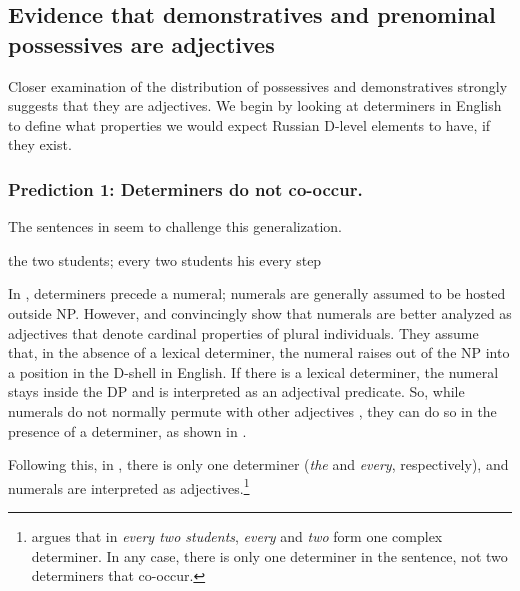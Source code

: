 \documentclass[output=paper,
colorlinks,
citecolor=brown,
newtxmath
]{langscibook}
\begin{document}

\subsection{Evidence that demonstratives and prenominal possessives are adjectives}

Closer examination of the distribution of possessives and demonstratives strong\-ly suggests that they are adjectives. We begin by looking at determiners in English to define what properties we would expect Russian D-level elements to have, if they exist.

\subsubsection*{Prediction 1: Determiners do not co-occur.}


\ea{}
\z\z

\noindent The sentences in  seem to challenge this generalization.


\ea\label{determiners}
    \ea the two students; every two students\label{twostudents}
    \ex his every step\label{hisstep}
\z\z

\noindent In , determiners precede a numeral; numerals are generally assumed to be hosted outside NP. However, \citet{Landman2003,Landman2004} and \citet{Rothstein2013,Rothstein2017} convincingly show that numerals are better analyzed as adjectives that denote cardinal properties of plural individuals. They assume that, in the absence of a lexical determiner, the numeral raises out of the NP into a position in the D-shell in English. If there is a lexical determiner, the numeral stays inside the DP and is interpreted as an adjectival predicate. So, while numerals do not normally permute with other adjectives , they can do so in the presence of a determiner, as shown in . 


\ea
    \label{fiftylions}
     \hfill \citep[217]{Landman2003}
\z\z

\noindent Following this, in , there is only one determiner (\textit{the} and \textit{every}, respectively), and numerals are interpreted as adjectives.\footnote{\citet{Landman2004} argues that in \textit{every two students}, \textit{every} and \textit{two} form one complex determiner. In any case, there is only one determiner in the sentence, not two determiners that co-occur.}
\end{document}
